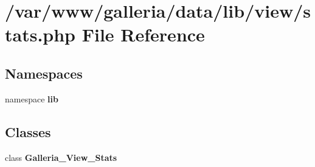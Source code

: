 \section{/var/www/galleria/data/lib/view/stats.php File Reference}
\label{stats_8php}
\subsection*{Namespaces}
\begin{CompactItemize}
\item 
namespace {\bf lib}
\end{CompactItemize}
\subsection*{Classes}
\begin{CompactItemize}
\item 
class {\bf Galleria\_\-View\_\-Stats}
\end{CompactItemize}
